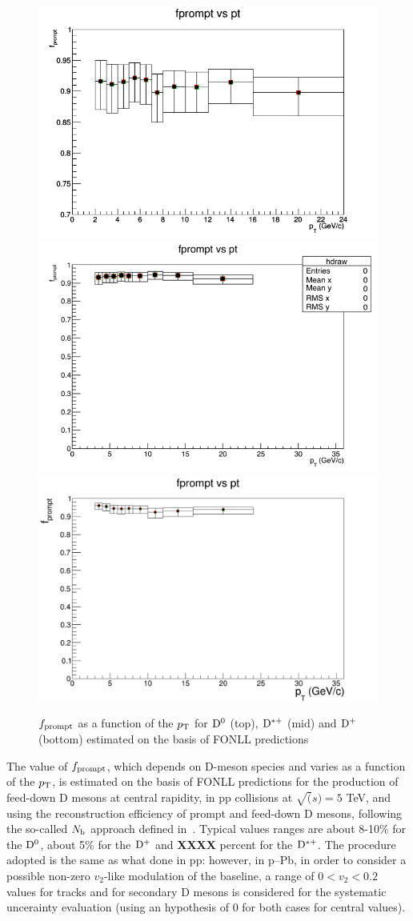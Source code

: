 \begin{figure}
\centering
\includegraphics[width=0.6\linewidth]{figures/Effs/fprompt_D0.png}
\includegraphics[width=0.6\linewidth]{figures/Effs/fprompt_Dstar.png}
\includegraphics[width=0.6\linewidth]{figures/Effs/fpromptDplus.png}
\caption{$f_{\rm prompt}$ as a function of the $p_{\rm T}$ for ${\rm D^0}$ (top), ${\rm D^{*+}}$ (mid) and ${\rm D^+}$ (bottom) estimated on the basis of FONLL predictions}
\end{figure}


The value of $f_{\rm prompt}$, which depends on D-meson species and varies as a function of the $p_{\rm T}$, is estimated on the basis of FONLL predictions for the production of feed-down D mesons at central rapidity, in pp collisions at $\sqrt(s) = 5$ TeV, and using the reconstruction efficiency of prompt and feed-down D mesons, following the so-called $N_{\rm b}$ approach defined in~\cite{ALICEDmespp7Tev}. Typical values ranges are about 8-10\% for the
${\rm D^0}$, about 5\% for the ${\rm D^+}$ and {\bf XXXX} percent for the ${\rm D^{*+}}$. The procedure adopted is the same as what done in pp: however, in p--Pb, in order to consider a possible non-zero $v_{2}$-like modulation of the baseline, a range of $0<v_{2}<0.2$ values for tracks and for secondary D mesons is considered for the systematic uncerainty evaluation (using an hypothesis of 0 for both cases for central values).

